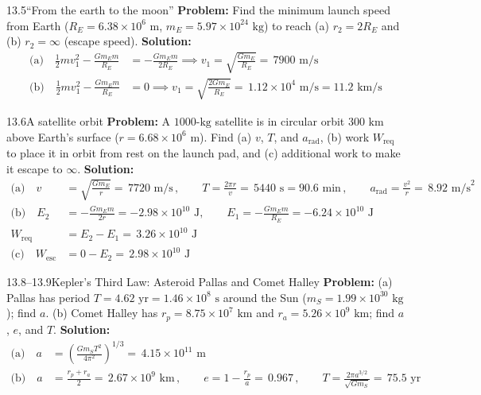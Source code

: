 \documentclass[11pt,a4paper,openany,oneside]{book}
\newcommand{\eqbox}[1]{\boxed{\,#1\,}}
\numberwithin{equation}{chapter}
\newcommand{\bk}[1]{\texorpdfstring{\enspace{\normalfont\small\color{slate}[Book #1]}}{ [Book #1]}}
\begin{document}
\begin{example}{13.5}{``From the earth to the moon''\bk{p.\ 410}}
\textbf{Problem:} Find the minimum launch speed from Earth ($R_E = 6.38\times 10^6\text{ m}$, $m_E = 5.97\times 10^{24}\text{ kg}$) to reach (a) $r_2 = 2R_E$ and (b) $r_2 = \infty$ (escape speed).
\tcblower
\textbf{Solution:}
\begin{align*}
  \text{(a)}\quad \frac{1}{2}mv_1^2 - \frac{Gm_E m}{R_E} &= -\frac{Gm_E m}{2R_E} \implies v_1 = \sqrt{\frac{Gm_E}{R_E}} = \eqbox{7900\text{ m/s}}\\
  \text{(b)}\quad \frac{1}{2}mv_1^2 - \frac{Gm_E m}{R_E} &= 0 \implies v_1 = \sqrt{\frac{2Gm_E}{R_E}} = \eqbox{1.12\times 10^4\text{ m/s} = 11.2\text{ km/s}}
\end{align*}
\end{example}

\begin{example}{13.6}{A satellite orbit\bk{p.\ 414}}
\textbf{Problem:} A $1000\text{-kg}$ satellite is in circular orbit $300\text{ km}$ above Earth's surface ($r = 6.68\times 10^6\text{ m}$). Find (a) $v$, $T$, and $a_{\text{rad}}$, (b) work $W_{\text{req}}$ to place it in orbit from rest on the launch pad, and (c) additional work to make it escape to $\infty$.
\tcblower
\textbf{Solution:}
\begin{align*}
  \text{(a)}\quad v &= \sqrt{\frac{Gm_E}{r}} = \eqbox{7720\text{ m/s}}, \qquad T = \frac{2\pi r}{v} = \eqbox{5440\text{ s} = 90.6\text{ min}}, \qquad a_{\text{rad}} = \frac{v^2}{r} = \eqbox{8.92\text{ m/s}^2}\\
  \text{(b)}\quad E_2 &= -\frac{Gm_E m}{2r} = -2.98\times 10^{10}\text{ J}, \qquad E_1 = -\frac{Gm_E m}{R_E} = -6.24\times 10^{10}\text{ J}\\
  W_{\text{req}} &= E_2 - E_1 = \eqbox{3.26\times 10^{10}\text{ J}}\\
  \text{(c)}\quad W_{\text{esc}} &= 0 - E_2 = \eqbox{2.98\times 10^{10}\text{ J}}
\end{align*}
\end{example}

\begin{example}{13.8--13.9}{Kepler's Third Law: Asteroid Pallas and Comet Halley\bk{p.\ 417}}
\textbf{Problem:} (a) Pallas has period $T = 4.62\text{ yr} = 1.46\times 10^8\text{ s}$ around the Sun ($m_S = 1.99\times 10^{30}\text{ kg}$); find $a$. (b) Comet Halley has $r_p = 8.75\times 10^7\text{ km}$ and $r_a = 5.26\times 10^9\text{ km}$; find $a$, $e$, and $T$.
\tcblower
\textbf{Solution:}
\begin{align*}
  \text{(a)}\quad a &= \left(\frac{Gm_S T^2}{4\pi^2}\right)^{1/3} = \eqbox{4.15\times 10^{11}\text{ m}}\\
  \text{(b)}\quad a &= \frac{r_p + r_a}{2} = \eqbox{2.67\times 10^9\text{ km}}, \qquad e = 1 - \frac{r_p}{a} = \eqbox{0.967}, \qquad T = \frac{2\pi a^{3/2}}{\sqrt{Gm_S}} = \eqbox{75.5\text{ yr}}
\end{align*}
\end{example}
\end{document}
